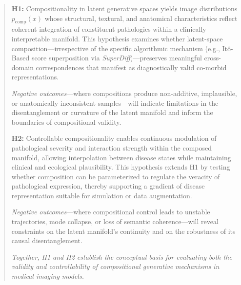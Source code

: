 \begin{quote}
\textbf{H1:} Compositionality in latent generative spaces yields image distributions \(p_{\mathrm{comp}}(x)\) whose structural, textural, and anatomical characteristics reflect coherent integration of constituent pathologies within a clinically interpretable manifold.  
This hypothesis examines whether latent-space composition—irrespective of the specific algorithmic mechanism (e.g., Itô-Based score superposition via \emph{SuperDiff})—preserves meaningful cross-domain correspondences that manifest as diagnostically valid co-morbid representations.

\emph{Negative outcomes}—where compositions produce non-additive, implausible, or anatomically inconsistent samples—will indicate limitations in the disentanglement or curvature of the latent manifold and inform the boundaries of compositional validity.

\vspace{1em}
\textbf{H2:} Controllable compositionality enables continuous modulation of pathological severity and interaction strength within the composed manifold, allowing interpolation between disease states while maintaining clinical and ecological plausibility.  
This hypothesis extends H1 by testing whether composition can be parameterized to regulate the veracity of pathological expression, thereby supporting a gradient of disease representation suitable for simulation or data augmentation.

\emph{Negative outcomes}—where compositional control leads to unstable trajectories, mode collapse, or loss of semantic coherence—will reveal constraints on the latent manifold’s continuity and on the robustness of its causal disentanglement.

\vspace{1em}
\textit{Together, H1 and H2 establish the conceptual basis for evaluating both the validity and controllability of compositional generative mechanisms in medical imaging models.}
\end{quote}

